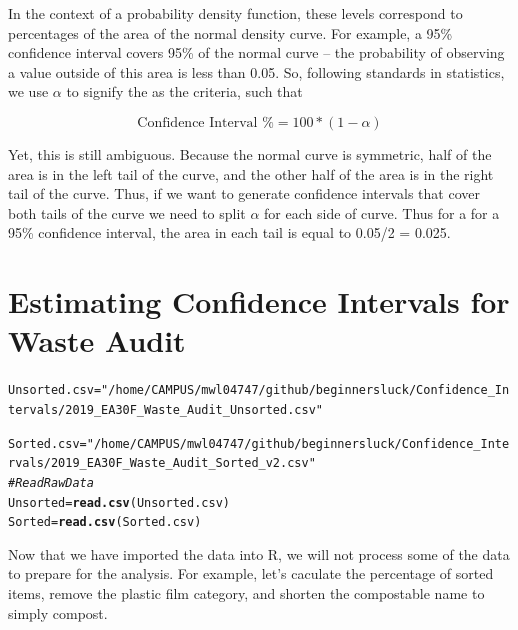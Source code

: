 \documentclass{tufte-handout}\usepackage[]{graphicx}\usepackage[]{color}
\makeatletter
\newcommand{\hlstr}[1]{\textcolor[rgb]{0.192,0.494,0.8}{#1}}%
\newcommand{\hlcom}[1]{\textcolor[rgb]{0.678,0.584,0.686}{\textit{#1}}}%
\newcommand{\hlstd}[1]{\textcolor[rgb]{0.345,0.345,0.345}{#1}}%
\newcommand{\hlkwb}[1]{\textcolor[rgb]{0.69,0.353,0.396}{#1}}%
\newcommand{\hlkwd}[1]{\textcolor[rgb]{0.737,0.353,0.396}{\textbf{#1}}}%
\newenvironment{kframe}{%
 \def\at@end@of@kframe{}%
 \ifinner\ifhmode%
  \def\at@end@of@kframe{\end{minipage}}%
  \begin{minipage}{\columnwidth}%
 \fi\fi%
 \def\FrameCommand##1{\hskip\@totalleftmargin \hskip-\fboxsep
 \colorbox{shadecolor}{##1}\hskip-\fboxsep
     \hskip-\linewidth \hskip-\@totalleftmargin \hskip\columnwidth}%
 \MakeFramed {\advance\hsize-\width
   \@totalleftmargin\z@ \linewidth\hsize
   \@setminipage}}%
 {\par\unskip\endMakeFramed%
 \at@end@of@kframe}
\newenvironment{knitrout}{}{} %
\makeatother
\begin{document}
In the context of a probability density function, these levels correspond to percentages of the area of the normal density curve. For example, a 95\% confidence interval covers 95\% of the normal curve -- the probability of observing a value outside of this area is less than 0.05. So, following standards in statistics, we use $\alpha$ to signify the as the criteria, such that

\begin{equation}
\textrm{Confidence Interval \% } = 100 * (1-\alpha)
\end{equation}

Yet, this is still ambiguous. Because the normal curve is symmetric, half of the area is in the left tail of the curve, and the other half of the area is in the right tail of the curve. Thus, if we want to generate confidence intervals that cover both tails of the curve we need to split $\alpha$ for each side of curve. Thus for a for a 95\% confidence interval, the area in each tail is equal to 0.05/2 = 0.025. 

\section{Estimating Confidence Intervals for Waste Audit}

\begin{knitrout}
\color{fgcolor}\begin{kframe}
\begin{alltt}
\hlstd{Unsorted.csv} \hlkwb{=} \hlstr{"/home/CAMPUS/mwl04747/github/beginnersluck/Confidence_Intervals/2019_EA30F_Waste_Audit_Unsorted.csv"}

\hlstd{Sorted.csv} \hlkwb{=} \hlstr{"/home/CAMPUS/mwl04747/github/beginnersluck/Confidence_Intervals/2019_EA30F_Waste_Audit_Sorted_v2.csv"}
\hlcom{# Read Raw Data}
\hlstd{Unsorted} \hlkwb{=} \hlkwd{read.csv}\hlstd{(Unsorted.csv)}
\hlstd{Sorted} \hlkwb{=} \hlkwd{read.csv}\hlstd{(Sorted.csv)}
\end{alltt}
\end{kframe}
\end{knitrout}

Now that we have imported the data into R, we will not process some of the data to prepare for the analysis. For example, let's caculate the percentage of sorted items, remove the plastic film category, and shorten the compostable name to simply compost. 
\end{document}
